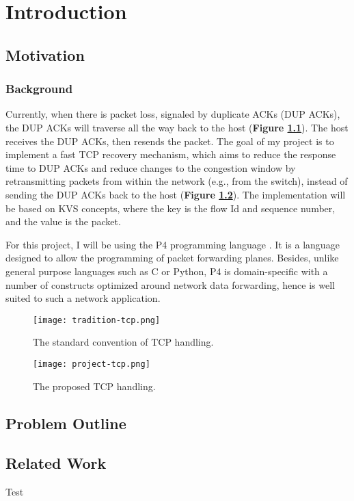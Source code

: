 \chapter{Introduction}

\section{Motivation}
\subsection{Background}

 Currently, when there is packet loss, signaled by duplicate ACKs (DUP ACKs), the DUP ACKs will traverse all the way back to the host (\textbf{Figure \ref{tradition-tcp}}). The host receives the DUP ACKs, then resends the packet. The goal of my project is to implement a fast TCP recovery mechanism, which aims to reduce the response time to DUP ACKs and reduce changes to the congestion window by retransmitting packets from within the network (e.g., from the switch), instead of sending the DUP ACKs back to the host (\textbf{Figure \ref{project-tcp}}). The implementation will be based on KVS concepts, where the key is the flow Id and sequence number, and the value is the packet.
 
For this project, I will be using the P4 programming language \cite{p4.org}. It is a language designed to allow the programming of packet forwarding planes. Besides, unlike general purpose languages such as C or Python, P4 is domain-specific with a number of constructs optimized around network data forwarding, hence is well suited to such a network application. 

\vspace*{5mm}

 \begin{figure}[h]
	\centering
	\texttt{[image: tradition-tcp.png]}
	\caption{The standard convention of TCP handling.}
	\label{tradition-tcp}
\end{figure}

\begin{figure}[h]
	\centering
	\texttt{[image: project-tcp.png]}
	\caption{The proposed TCP handling.}
	\label{project-tcp}
\end{figure}


\section{Problem Outline}
\section{Related Work}
\newpage
Test